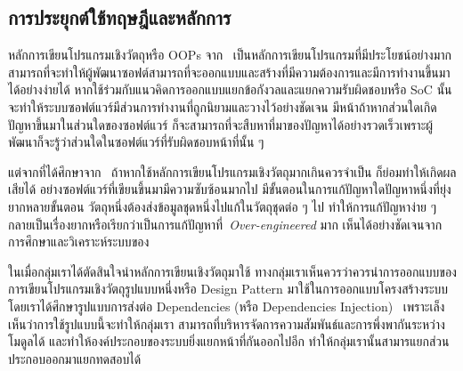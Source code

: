\documentclass[12pt,one side,openright,a4paper]{cpe-thesis-th}
\newcommand{\thaijustify}[1]{%
  \par\hspace{30pt}\justifying
  #1
}
\begin{document}
    \subsection{การประยุกต์ใช้ทฤษฎีและหลักการ}
        \thaijustify{
            หลักการเขียนโปรแกรมเชิงวัตถุหรือ OOPs จาก~\cite{booch87, meyer2000, apollo22oop} เป็นหลักการเขียนโปรแกรมที่มีประโยชน์อย่างมาก สามารถที่จะทำให้ผู้พัฒนาซอฟต์สามารถที่จะออกแบบและสร้างที่มีความต้องการและมีการทำงานขึ้นมาได้อย่างง่ายได้ หากใช้ร่วมกับแนวคิดการออกแบบแยกข้อกังวลและแยกความรับผิดชอบหรือ SoC นั้น จะทำให้ระบบซอฟต์แวร์มีส่วนการทำงานที่ถูกนิยามและวางไว้อย่างชัดเจน มีหน้าถ้าหากส่วนใดเกิดปัญหาขึ้นมาในส่วนใดของซอฟต์แวร์ ก็จะสามารถที่จะสืบหาที่มาของปัญหาได้อย่างรวดเร็วเพราะผู้พัฒนาก็จะรู้ว่าส่วนใดในซอฟต์แวร์ที่รับผิดชอบหน้าที่นั้น ๆ~\cite{nattawat20pgs, wikipedia04soc}
        }
        \thaijustify{
            แต่จากที่ได้ศึกษาจาก~\cite{thomas99pragmatic, fowler13oop, nattawat20pgs} ถ้าหากใช้หลักการเขียนโปรแกรมเชิงวัตถุมากเกินควรจำเป็น ก็ย่อมทำให้เกิดผลเสียได้ อย่างซอฟต์แวร์ที่เขียนขึ้นมามีความซับซ้อนมากไป มีขั้นตอนในการแก้ปัญหาใดปัญหาหนึ่งที่ยุ่งยากหลายขั้นตอน วัตถุหนึ่งต้องส่งข้อมูลชุดหนึ่งไปแก้ในวัตถุชุดต่อ ๆ ไป ทำให้การแก้ปัญหาง่าย ๆ กลายเป็นเรื่องยากหรือเรียกว่าเป็นการแก้ปัญหาที่~\textit{Over-engineered} มาก เห็นได้อย่างชัดเจนจากการศึกษาและวิเคราะห์ระบบของ~\cite{nattawat20pgs}
        }
        \thaijustify{
            ในเมื่อกลุ่มเราได้ตัดสินใจนำหลักการเขียนเชิงวัตถุมาใช้ ทางกลุ่มเราเห็นควรว่าควรนำการออกแบบของการเขียนโปรแกรมเชิงวัตถุรูปแบบหนึ่งหรือ Design Pattern มาใช้ในการออกแบบโครงสร้างระบบ โดยเราได้ศึกษารูปแบบการส่งต่อ Dependencies (หรือ Dependencies Injection)~\cite{shore06, fowlerDI, freeman09} เพราะเล็งเห็นว่าการใช้รูปแบบนี้จะทำให้กลุ่มเรา สามารถที่บริหารจัดการความสัมพันธ์และการพึ่งพากันระหว่างโมดูลได้ และทำให้องค์ประกอบของระบบยิ่งแยกหน้าที่กันออกไปอีก ทําให้กลุ่มเรานั้นสามารแยกส่วนประกอบออกมาแยกทดสอบได้~\cite{fowlerDI, tiwaristackdi, toanstackdi}
        }
\end{document}
